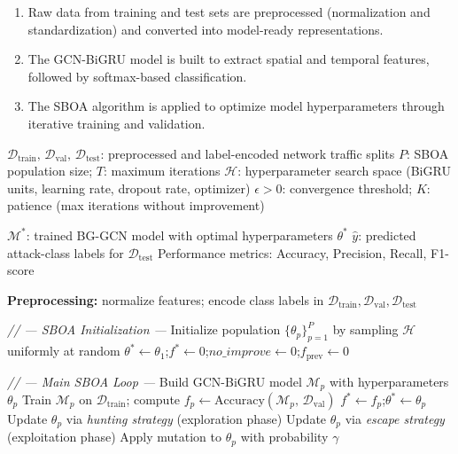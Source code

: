 \documentclass[a4paper,fleqn]{cas-sc}
\begin{document}
\begin{enumerate}
\item Raw data from training and test sets are preprocessed (normalization and standardization) and converted into model-ready representations.
\item The GCN-BiGRU model is built to extract spatial and temporal features, followed by softmax-based classification.
\item The SBOA algorithm is applied to optimize model hyperparameters through iterative training and validation.
\end{enumerate}

\begin{algorithm}
\caption{BG-GCN with SBOA Hyperparameter Optimization}
\begin{algorithmic}[1]

\Require{} $\mathcal{D}_{\mathrm{train}},\,\mathcal{D}_{\mathrm{val}},\,\mathcal{D}_{\mathrm{test}}$: preprocessed and label-encoded network traffic splits
\Require{} $P$: SBOA population size;\; $T$: maximum iterations
\Require{} $\mathcal{H}$: hyperparameter search space (BiGRU units, learning rate, dropout rate, optimizer)
\Require{} $\epsilon > 0$: convergence threshold;\; $K$: patience (max iterations without improvement)

\Ensure{} $\mathcal{M}^{*}$: trained BG-GCN model with optimal hyperparameters $\theta^{*}$
\Ensure{} $\hat{y}$: predicted attack-class labels for $\mathcal{D}_{\mathrm{test}}$
\Ensure{} Performance metrics: Accuracy, Precision, Recall, F1-score

\Statex
\State \textbf{Preprocessing:} normalize features; encode class labels in $\mathcal{D}_{\mathrm{train}},\mathcal{D}_{\mathrm{val}},\mathcal{D}_{\mathrm{test}}$

\Statex{}\textit{// --- SBOA Initialization ---}
\State Initialize population $\{\theta_p\}_{p=1}^{P}$ by sampling $\mathcal{H}$ uniformly at random
\State $\theta^{*} \leftarrow \theta_1$;\quad $f^{*} \leftarrow 0$;\quad $\textit{no\_improve} \leftarrow 0$;\quad $f_{\mathrm{prev}} \leftarrow 0$

\Statex{}\textit{// --- Main SBOA Loop ---}
    \State Build GCN-BiGRU model $\mathcal{M}_p$ with hyperparameters $\theta_p$
    \State Train $\mathcal{M}_p$ on $\mathcal{D}_{\mathrm{train}}$; compute $f_p \leftarrow \mathrm{Accuracy}(\mathcal{M}_p,\,\mathcal{D}_{\mathrm{val}})$
      \State $f^{*} \leftarrow f_p$;\quad $\theta^{*} \leftarrow \theta_p$ 
    \EndIf
    \State Update $\theta_p$ via \textit{hunting strategy} (exploration phase)
    \State Update $\theta_p$ via \textit{escape strategy} (exploitation phase)
    \State Apply mutation to $\theta_p$ with probability $\gamma$
  \EndFor


\end{algorithmic}
\end{algorithm}
\end{document}

